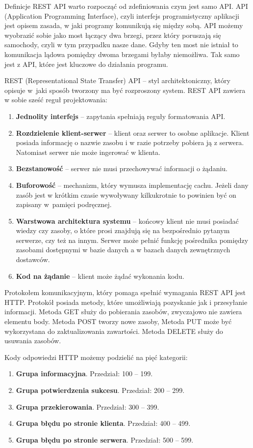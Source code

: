 \documentclass[a4paper,twoside,12pt]{book}
\begin{document}
Definicje REST API warto rozpocząć od zdefiniowania czym jest samo API.  
API (Application Programming Interface), czyli interfejs programistyczny aplikacji jest opisem zasada, w jaki programy komunikują się między sobą. API możemy wyobrazić sobie jako most łączący dwa brzegi, przez który poruszają się samochody, czyli w tym przypadku nasze dane. Gdyby ten most nie istniał to komunikacja lądowa pomiędzy dwoma brzegami byłaby niemożliwa. Tak samo jest z API, które jest kluczowe do działania programu.  

REST (Representational State Transfer) API – styl architektoniczny, który opisuje w~jaki sposób tworzony ma być rozproszony system. REST API zawiera w sobie sześć reguł projektowania: 
\begin{enumerate}
    \item \textbf{Jednolity interfejs} -- zapytania spełniają reguły formatowania API.
    \item \textbf{Rozdzielenie klient-serwer} -- klient oraz serwer to osobne aplikacje. Klient posiada informację o nazwie zasobu i w razie potrzeby pobiera ją z serwera. Natomiast serwer nie może ingerować w klienta. 
    \item \textbf{Bezstanowość} -- serwer nie musi przechowywać informacji o żądaniu.
    \item \textbf{Buforowość} -- mechanizm, który wymusza implementację cachu. Jeżeli dany zasób jest w krótkim czasie wywoływany kilkukrotnie to powinien być on zapisany w~pamięci podręcznej. 
    \item \textbf{Warstwowa architektura systemu} -- końcowy klient nie musi posiadać wiedzy czy zasoby, o które prosi znajdują się na bezpośrednio pytanym serwerze, czy też na innym. Serwer może pełnić funkcję pośrednika pomiędzy zasobami dostępnymi w bazie danych a w bazach danych zewnętrznych dostawców. 
    \item \textbf{Kod na żądanie} -- klient może żądać wykonania kodu.
\end{enumerate}

Protokołem komunikacyjnym, który pomaga spełnić wymagania REST API jest HTTP. Protokół posiada metody, które umożliwiają pozyskanie jak i przesyłanie informacji. Metoda GET służy do pobierania zasobów, zwyczajowo nie zawiera elementu body. Metoda POST tworzy nowe zasoby, Metoda PUT może być wykorzystana do zaktualizowania zawartości. Metoda DELETE służy do usuwania zasobów.  

Kody odpowiedzi HTTP możemy podzielić na pięć kategorii: 
\begin{enumerate}
    \item \textbf{Grupa informacyjna}. Przedział: 100 -- 199.
    \item \textbf{Grupa potwierdzenia sukcesu}. Przedział: 200 -- 299.
    \item \textbf{Grupa przekierowania}. Przedział: 300 -- 399.
    \item \textbf{Grupa błędu po stronie klienta}. Przedział: 400 -- 499.
    \item \textbf{Grupa błędu po stronie serwera}. Przedział: 500 -- 599.
\end{enumerate}
\end{document}
